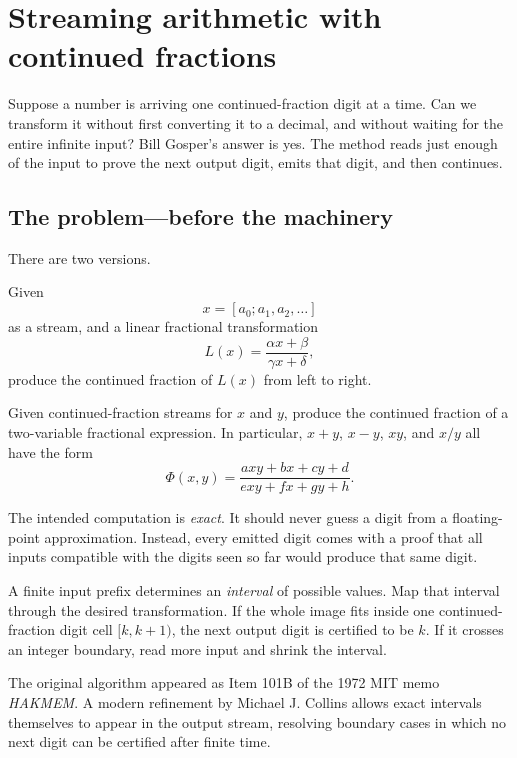 \chapter{Streaming arithmetic with continued fractions}\label{app:gosper}

Suppose a number is arriving one continued-fraction digit at a time.  Can we
transform it without first converting it to a decimal, and without waiting for
the entire infinite input?  Bill Gosper's answer is yes.  The method reads just
enough of the input to prove the next output digit, emits that digit, and then
continues.

\section{The problem---before the machinery}

There are two versions.

\begin{description}[leftmargin=2.7cm,style=nextline]
  \item[One input.] Given
  \[
    x=[a_0;a_1,a_2,\dots]
  \]
  as a stream, and a linear fractional transformation
  \[
    L(x)=\frac{\alpha x+\beta}{\gamma x+\delta},
  \]
  produce the continued fraction of $L(x)$ from left to right.

  \item[Two inputs.] Given continued-fraction streams for $x$ and $y$, produce
  the continued fraction of a two-variable fractional expression.  In
  particular, $x+y$, $x-y$, $xy$, and $x/y$ all have the form
  \[
    \Phi(x,y)=\frac{axy+bx+cy+d}{exy+fx+gy+h}.
  \]
\end{description}

The intended computation is \emph{exact}.  It should never guess a digit from
a floating-point approximation.  Instead, every emitted digit comes with a
proof that all inputs compatible with the digits seen so far would produce that
same digit.

\begin{bigidea}
A finite input prefix determines an \emph{interval} of possible values.  Map
that interval through the desired transformation.  If the whole image fits
inside one continued-fraction digit cell $[k,k+1)$, the next output digit is
certified to be $k$.  If it crosses an integer boundary, read more input and
shrink the interval.
\end{bigidea}

The original algorithm appeared as Item 101B of the 1972 MIT memo
\emph{HAKMEM}.  A modern refinement by Michael J. Collins allows exact
intervals themselves to appear in the output stream, resolving boundary cases
in which no next digit can be certified after finite time.

